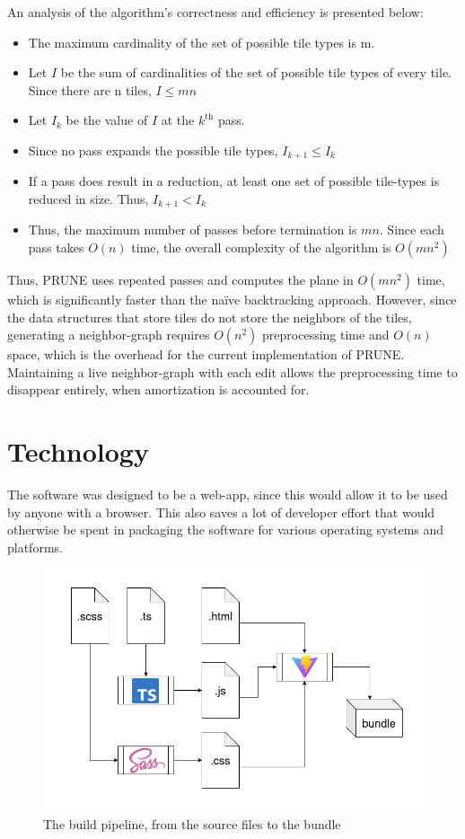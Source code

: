 \documentclass[letterpaper,11pt]{article}
\begin{document}
An analysis of the algorithm's correctness and efficiency is presented below:

\begin{itemize}
	\item The maximum cardinality of the set of possible tile types is m.
	\item Let $I$ be the sum of cardinalities of the set of possible tile types of every tile. Since there are n tiles, $I \leq mn$
	\item Let $I_k$ be the value of $I$ at the $k^{\text{th}}$ pass.
	\item Since no pass expands the possible tile types, $I_{k+1} \leq I_k$
	\item If a pass does result in a reduction, at least one set of possible tile-types is reduced in size. Thus, $I_{k+1} < I_k$
	\item Thus, the maximum number of passes before termination is $mn$. Since each pass takes $O(n)$ time, the overall complexity of the algorithm is $O(mn^2)$
\end{itemize}

Thus, PRUNE uses repeated passes and computes the plane in $O(mn^2)$ time, which is significantly faster than the naïve backtracking approach. However, since the data structures that store tiles do not store the neighbors of the tiles, generating a neighbor-graph requires $O(n^2)$ preprocessing time and $O(n)$ space, which is the overhead for the current implementation of PRUNE. Maintaining a live neighbor-graph with each edit allows the preprocessing time to disappear entirely, when amortization is accounted for.


\section*{Technology}

The software was designed to be a web-app, since this would allow it to be used by anyone with a browser. This also saves a lot of developer effort that would otherwise be spent in packaging the software for various operating systems and platforms.

\begin{figure}[h!tbp]
	\centering
	\includegraphics[width=6.4in]{figures/pipeline.png}
	\caption{The build pipeline, from the source files to the bundle}
	\label{fig:2}
\end{figure}
\end{document}
